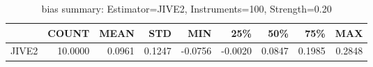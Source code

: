 \begin{table}[ht]
\centering
\caption{bias summary: Estimator=JIVE2, Instruments=100, Strength=0.20}
\begin{tabular}{lrrrrrrrr}
\toprule
 & COUNT & MEAN & STD & MIN & 25\% & 50\% & 75\% & MAX \\
\midrule
JIVE2 & 10.0000 & 0.0961 & 0.1247 & -0.0756 & -0.0020 & 0.0847 & 0.1985 & 0.2848 \\
\bottomrule
\end{tabular}
\end{table}

